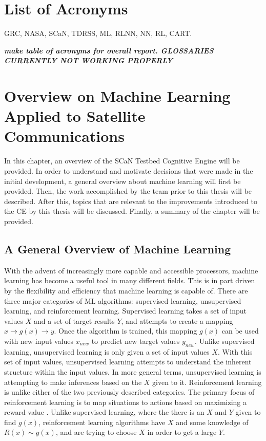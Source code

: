 \documentclass[11pt]{report}
\begin{document}
	\chapter{List of Acronyms}
	GRC, NASA, SCaN, TDRSS, ML, RLNN, NN, RL, CART.
	\par \textbf{\textit{make table of acronyms for overall report. GLOSSARIES CURRENTLY NOT WORKING PROPERLY}}
	
	\chapter{Overview on Machine Learning Applied to Satellite Communications}
		\par In this chapter, an overview of the SCaN Testbed Cognitive Engine will be provided. In order to understand and motivate decisions that were made in the initial development, a general overview about machine learning will first be provided. Then, the work accomplished by the team prior to this thesis will be described. After this, topics that are relevant to the improvements introduced to the CE by this thesis will be discussed. Finally, a summary of the chapter will be provided.
	\section{A General Overview of Machine Learning}\label{bg:introToML}
	\par With the advent of increasingly more capable and accessible processors, machine learning has become a useful tool in many different fields. This is in part driven by the flexibility and efficiency that machine learning is capable of. There are three major categories of ML algorithms\cite{IntroductionToML}: supervised learning, unsupervised learning, and reinforcement learning. Supervised learning takes a set of input values $X$ and a set of target results $Y$, and attempts to create a mapping $x \to g(x)\to y$. Once the algorithm is trained, this mapping $g(x)$ can be used with new input values $x_{new}$ to predict new target values $y_{new}$. Unlike supervised learning, unsupervised learning is only given a set of input values $X$. With this set of input values, unsupervised learning attempts to understand the inherent structure within the input values. In more general terms, unsupervised learning is attempting to make inferences based on the $X$ given to it. Reinforcement learning is unlike either of the two previously described categories. The primary focus of reinforcement learning is to map situations to actions based on maximizing a reward value \cite{rl_intro}. Unlike supervised learning, where the there is an $X$ and $Y$ given to find $g(x)$, reinforcement learning algorithms have $X$ and some knowledge of $R(x)\sim g(x)$, and are trying to choose $X$ in order to get a large $Y$. 
	
\end{document}
